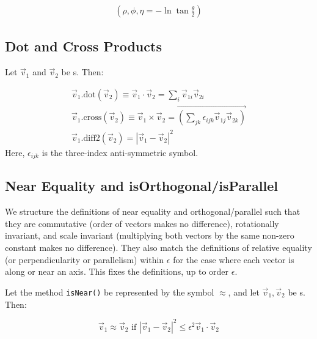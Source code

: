 \begin{eqnarray}
  \left( \rho, \phi, \eta = - \ln { \tan { \frac {\theta}{2} } } \right)
  \label{eq:spherical}
\end{eqnarray}

\subsection {Dot and Cross Products}

\noindent
Let $\vec{v}_{1}$ and $\vec{v}_{2}$ be \SV s.  Then:

\begin{eqnarray}
  \vec{v}_{1}.\mbox{dot} (\vec{v}_{2}) \equiv
    \vec{v}_{1} \cdot \vec{v}_{2} = \sum_{i} \vec{v}_{1i} \vec{v}_{2i}
    \label{eq:dot} \\
  \vec{v}_{1}.\mbox{cross} (\vec{v}_{2}) \equiv
    \vec{v}_{1} \times \vec{v}_{2} = \stackrel{\longrightarrow} 
	{ {\textstyle \left( 
		\sum_{jk} \epsilon_{ijk} \vec{v}_{1j} \vec{v}_{2k} \right) } }
    \label{eq:cross} \\
  \vec{v}_{1}.\mbox{diff2} (\vec{v}_{2}) =
    \left| \vec{v}_{1} - \vec{v}_{2} \right| ^ 2 \label{eq:diff2}
\end{eqnarray}
\noindent
Here, $\epsilon_{ijk}$ is the three-index anti-symmetric symbol.


\subsection {Near Equality and isOrthogonal/isParallel}

\noindent
We structure the definitions of near equality and orthogonal/parallel such that
they are commutative (order of vectors makes no difference), rotationally
invariant, and scale invariant (multiplying both vectors by the same non-zero
constant makes no difference).  They also match the definitions of relative
equality (or perpendicularity or parallelism) within $\epsilon$ for the case
where each vector is along or near an axis.  This fixes the definitions, up to
order $\epsilon$.

\noindent
Let the method {\tt isNear()} be represented by the symbol $\approx$,
and let $\vec{v}_{1}, \vec{v}_{2}$ be \SV s.
Then:

\begin{equation}
\label{vecisnear}
\vec{v}_{1} \approx \vec{v}_{2} \mbox{ if }
  \left| \vec{v}_{1} - \vec{v}_{2} \right| ^ 2
  \leq \epsilon^2 \vec{v}_{1} \cdot \vec{v}_{2}
  \label{eq:isNear}
\end{equation}

